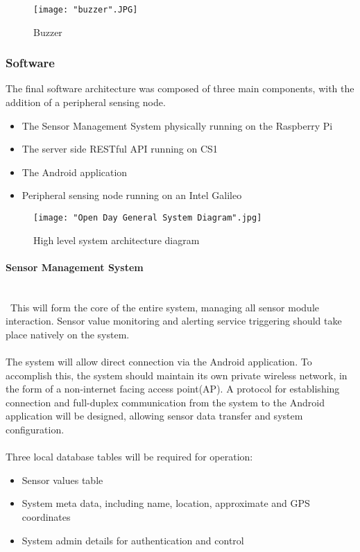 \documentclass{article}
\begin{document}
\begin{figure}[H]
\centering
\texttt{[image: "buzzer".JPG]}
\caption{Buzzer}
\label{fig:hard_camera}
\end{figure}

\subsubsection{Software}
The final software architecture was composed of three main components, with the addition of a peripheral sensing node.

\begin{itemize}
  \item The Sensor Management System physically running on the Raspberry Pi
  \item The server side RESTful API running on CS1
  \item The Android application
  \item Peripheral sensing node running on an Intel Galileo 
\end{itemize}

\begin{figure}[H]
\centering
\texttt{[image: "Open Day General System Diagram".jpg]}
\caption{High level system architecture diagram}
\label{overflow}
\end{figure}

\paragraph{Sensor Management System}
\noindent
\\\
This will form the core of the entire system, managing all sensor module interaction. Sensor value monitoring and alerting service triggering should take place natively on the system. \\\\ The system will allow direct connection via the Android application. To accomplish this, the system should maintain its own private wireless network, in the form of a non-internet facing access point(AP). A protocol for establishing connection and full-duplex communication from the system to the Android application will be designed, allowing sensor data transfer and system configuration. \\\\ 
Three local database tables will be required for operation:

\begin{itemize}
  \item Sensor values table
  \item System meta data, including name, location, approximate and GPS coordinates 
  \item System admin details for authentication and control
\end{itemize}
\end{document}
